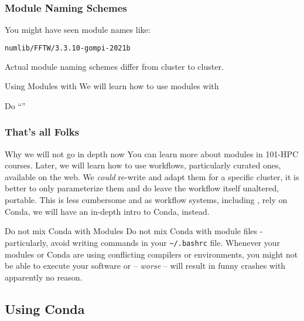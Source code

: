 \begin{frame}[fragile]
  \frametitle{Module Naming Schemes}
   You might have seen module names like:
   \begin{lstlisting}[language=Bash, style=Shell]
numlib/FFTW/3.3.10-gompi-2021b   
   \end{lstlisting}
   Actual module naming schemes differ from cluster to cluster.
   \pause
   \begin{block}{Using Modules with \Snakemake{}}
     We will learn how to use modules with 
   \end{block}
   \pause
   \begin{task}
   	  Do ``''
   \end{task}
\end{frame}

\begin{frame}[fragile]
  \frametitle{That's all Folks}
   \vspace{-0.8em}
  \begin{alertblock}{Why we will not go in depth now}
You can learn more about modules in 101-HPC courses. Later, we will learn how to use \Snakemake{} workflows, particularly curated ones, available on the web. We \emph{could} re-write and adapt them for a specific cluster, it is better to only parameterize them and do leave the workflow itself unaltered, portable. This is less cumbersome and as workflow systems, including \Snakemake{}, rely on Conda, we will have an in-depth intro to Conda, instead.
  \end{alertblock}
  \vfill
  \begin{alertblock}{Do not mix Conda with Modules}
   Do not mix Conda with module files - particularly, avoid writing  commands in your \texttt{\textasciitilde/.bashrc} file.\newline
   Whenever your modules or Conda are using conflicting compilers or environments, you might not be able to execute your software or -- \emph{worse} -- will result in funny crashes with apparently no reason.
  \end{alertblock}
\end{frame}

\subsection{Using Conda}


